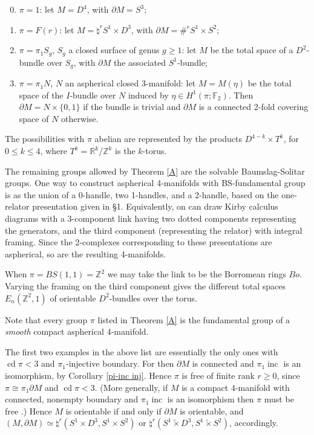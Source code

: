 \documentclass[12pt]{amsart}
\renewcommand{\geq}{\geqslant}
\renewcommand{\leq}{\leqslant}
\theoremstyle{definition}
\newcommand{\F}{\mathbb F}
\DeclareMathOperator{\cd}{cd}
\DeclareMathOperator{\inc}{inc}
\begin{document}
\begin{enumerate}
 \setcounter{enumi}{-1}
\item$\pi=1$: let $M=D^4$, with $\partial{M}=S^3$;
\item$\pi=F(r)$: let $M=\natural^rS^1\times{D^3}$, with $\partial{M}=\#^rS^1\times{S^2}$;
\item$\pi=\pi_1S_g$, $S_g$ a closed surface of genus $g\geq1$: let $M$ be the total space
of a $D^2$-bundle over $S_g$, with $\partial{M}$ the associated $S^1$-bundle;
\item$\pi=\pi_1N$, $N$ an aspherical closed 3-manifold: 
let $M=M(\eta)$ be the total space of the $I$-bundle over $N$ induced by 
$\eta\in{H^1(\pi;\F_2)}$.
Then $\partial{M}=N\times\{0,1\}$ if the bundle is trivial and
$\partial{M}$ is a connected 2-fold covering space of $N$ otherwise.
\end{enumerate}

The possibilities with $\pi$ abelian are represented by the products 
$D^{4-k}\times{T^k}$, for $0\leq{k}\leq4$, 
where $T^k=\mathbb{R}^k/\mathbb{Z}^k$ is the $k$-torus.

The remaining groups allowed by Theorem \ref{A}
are the solvable Baumslag-Solitar groups.   One way to construct aspherical 4-manifolds with BS-fundamental group is as
the union of a 0-handle, two 1-handles, and a 2-handle, based on the one-relator presentation given in \S1.  
Equivalently, on can draw Kirby calculus diagrams 
with a 3-component link having two dotted components 
representing the generators,
and the third component (representing the relator) with integral framing.
Since the 2-complexes corresponding to these presentations are aspherical, 
so are the resulting 4-manifolds.

When $\pi=BS(1,1)=\mathbb{Z}^2$
we may take the link to be the Borromean rings $Bo$.
Varying the framing on the third component gives the 
different total spaces $E_n(\mathbb{Z}^2,1)$  
of orientable $D^2$-bundles over the torus.

Note that  every group $\pi$ listed in Theorem \ref{A} is the fundamental group of a {\em smooth} compact aspherical 4-manifold.

The first two examples in the above list are essentially the only ones 
with $\cd\pi<3$ and $\pi_1$-injective boundary.
For then $\partial{M}$ is connected and $\pi_1\inc$ is an isomorphism, 
by Corollary \ref{pi-inc inj}.
Hence $\pi$ is free of finite rank $r\geq0$, 
since $\pi\cong\pi_1\partial{M}$ and $\cd\pi<3$.
(More generally, if $M$ is a compact 4-manifold with connected, nonempty boundary and $\pi_1\inc$ is an isomorphism then $\pi$ must be free
\cite{Da94}.)
Hence $M$ is orientable if and only if $\partial{M}$ is orientable, 
and $(M,\partial{M})\simeq\natural^r(S^1\times{D^3},S^1\times{S^2})$ 
or $\natural^r(S^1\tilde\times{D^3},S^1\tilde\times{S^2})$,
accordingly. 
\end{document}
